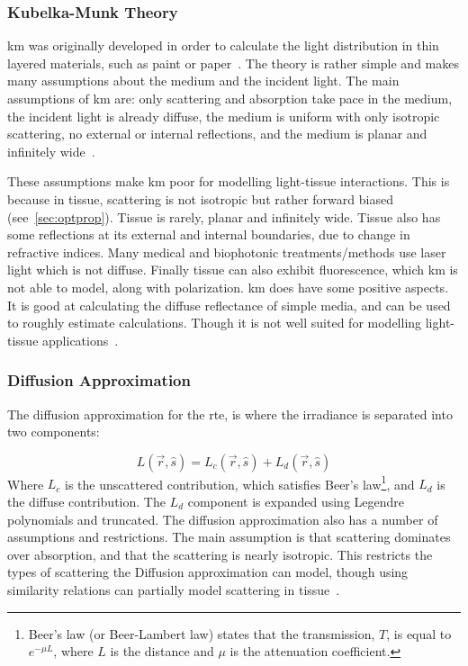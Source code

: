 \subsubsection*{Kubelka-Munk Theory}
\gls*{km} was originally developed in order to calculate the light distribution in thin layered materials, such as paint or paper~\cite{barbaric2011kubelka}. The theory is rather simple and makes many assumptions about the medium and the incident light. The main assumptions of \gls*{km} are: only scattering and absorption take pace in the medium, the incident light is already diffuse, the medium is uniform with only isotropic scattering, no external or internal reflections, and the medium is planar and infinitely wide~\cite{jasinski2011modelling,cheong1990review,gabriela2013mathematical}.

These assumptions make \gls*{km} poor for modelling light-tissue interactions.
This is because in tissue, scattering is not isotropic but rather forward biased (see~\cref{sec:optprop}). Tissue is rarely, planar and infinitely wide. Tissue also has some reflections at its external and internal boundaries, due to change in refractive indices. Many medical and biophotonic treatments/methods use laser light which is not diffuse. Finally tissue can also exhibit fluorescence, which \gls*{km} is not able to model, along with polarization. 
\gls*{km} does have some positive aspects. It is good at calculating the diffuse reflectance of simple media, and can be used to roughly estimate calculations. Though it is not well suited for modelling light-tissue applications~\cite{prahl1990light}.

\subsubsection*{Diffusion Approximation}
The diffusion approximation for the \gls*{rte}, is where the irradiance is separated into two components:

\begin{equation}
	L(\vec{r},\hat{s}) = L_c(\vec{r},\hat{s}) + L_d(\vec{r},\hat{s})
\end{equation}
Where $L_c$ is the unscattered contribution, which satisfies Beer's law\footnote{Beer's law (or Beer-Lambert law) states that the transmission, $T$, is equal to $e^{-\mu L}$, where $L$ is the distance and $\mu$ is the attenuation coefficient.}, and $L_d$ is the diffuse contribution. The $L_d$ component is expanded using Legendre polynomials and truncated. 
The diffusion approximation also has a number of assumptions and restrictions. The main assumption is that scattering dominates over absorption, and that the scattering is nearly isotropic. This restricts the types of scattering the Diffusion approximation can model, though using similarity relations can partially model scattering in tissue~\cite{graaff1993similarity,yoon1989accuracies}.

